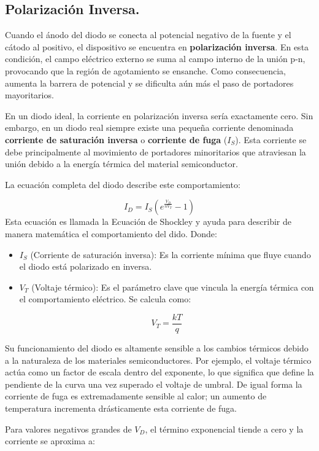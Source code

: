 \documentclass[journal]{IEEEtran}
\begin{document}
\subsection{Polarización Inversa.}
Cuando el ánodo del diodo se conecta al potencial negativo de la fuente y el cátodo al positivo, el dispositivo se encuentra en \textbf{polarización inversa}. En esta condición, el campo eléctrico externo se suma al campo interno de la unión p-n, provocando que la región de agotamiento se ensanche. Como consecuencia, aumenta la barrera de potencial y se dificulta aún más el paso de portadores mayoritarios.

En un diodo ideal, la corriente en polarización inversa sería exactamente cero. Sin embargo, en un diodo real siempre existe una pequeña corriente denominada \textbf{corriente de saturación inversa} o \textbf{corriente de fuga} ($I_S$). Esta corriente se debe principalmente al movimiento de portadores minoritarios que atraviesan la unión debido a la energía térmica del material semiconductor.

La ecuación completa del diodo describe este comportamiento:

\begin{equation} I_D = I_S \left( e^{\frac{V_D}{n V_T}} - 1 \right) \end{equation}
Esta ecuación es llamada la Ecuación de Shockley y ayuda para describir de manera matemática el comportamiento del dido.
Donde:
\begin{itemize}
    \item $I_S$ (Corriente de saturación inversa): Es la corriente mínima que fluye cuando el diodo está polarizado en inversa.
    
    \item $V_T$ (Voltaje térmico): Es el parámetro clave que vincula la energía térmica con el comportamiento eléctrico. Se calcula como:
    
    \[
        V_T = \frac{kT}{q}
    \]
\end{itemize}
Su funcionamiento del diodo es altamente sensible a los cambios térmicos debido a la naturaleza de los materiales semiconductores. 
Por ejemplo, el voltaje térmico actúa como un factor de escala dentro del exponente, lo que significa que define la pendiente de la 
curva una vez superado el voltaje de umbral. De igual forma la corriente de fuga es extremadamente sensible al calor; un aumento de 
temperatura incrementa drásticamente esta corriente de fuga.

Para valores negativos grandes de $V_D$, el término exponencial tiende a cero y la corriente se aproxima a:
\end{document}
